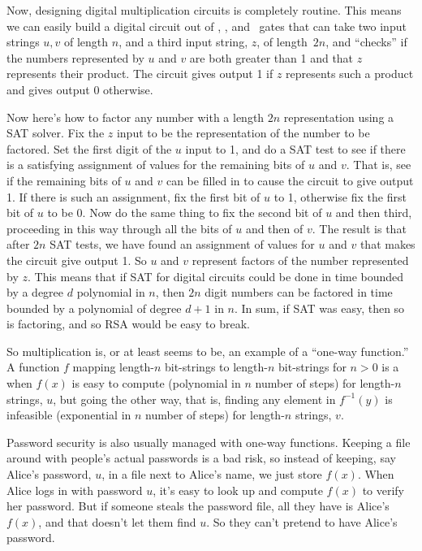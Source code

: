 Now, designing digital multiplication circuits is completely routine.
This means we can easily build a digital circuit out of \QAND, \QOR,
and \QNOT\ gates that can take two input strings $u,v$ of length $n$,
and a third input string, $z$, of length~$2n$, and ``checks'' if the
numbers represented by $u$ and $v$ are both greater than 1 and that $z$
represents their product.  The circuit gives output 1 if $z$
represents such a product and gives output 0 otherwise.

Now here's how to factor any number with a length $2n$ representation
using a SAT solver.  Fix the $z$ input to be the representation of the
number to be factored.  Set the first digit of the $u$ input to 1, and
do a SAT test to see if there is a satisfying assignment of values for
the remaining bits of $u$ and $v$.  That is, see if the remaining bits
of $u$ and $v$ can be filled in to cause the circuit to give output 1.
If there is such an assignment, fix the first bit of $u$ to 1,
otherwise fix the first bit of $u$ to be 0.  Now do the same thing to
fix the second bit of $u$ and then third, proceeding in this way
through all the bits of $u$ and then of $v$.  The result is that after
$2n$ SAT tests, we have found an assignment of values for $u$ and $v$
that makes the circuit give output 1.  So $u$ and $v$ represent
factors of the number represented by $z$.  This means that if SAT for
digital circuits could be done in time bounded by a degree $d$
polynomial in $n$, then $2n$ digit numbers can be factored in time
bounded by a polynomial of degree $d+1$ in $n$.  In sum, if SAT was
easy, then so is factoring, and so RSA would be easy to break.

\begin{editingnotes}
\end{editingnotes}

\iffalse

So multiplication is, or at least seems to be, an example of a
``one-way function.''  A function $f$ mapping length-$n$ bit-strings
to length-$n$ bit-strings for $n > 0$ is a 
when $f(x)$ is easy to compute (polynomial in $n$ number of steps) for
length-$n$ strings, $u$, but going the other way, that is, finding any
element in $f^{-1}(y)$ is infeasible (exponential in $n$ number of
steps) for length-$n$ strings, $v$.

Password security is also usually managed with one-way functions.
Keeping a file around with people's actual passwords is a bad risk, so
instead of keeping, say Alice's password, $u$, in a file next to
Alice's name, we just store $f(x)$.  When Alice logs in with password
$u$, it's easy to look up and compute $f(x)$ to verify her password.
But if someone steals the password file, all they have is Alice's
$f(x)$, and that doesn't let them find $u$.  So they can't pretend to
have Alice's password.

